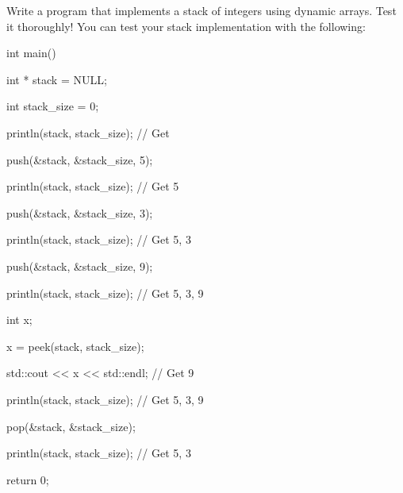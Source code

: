 Write a program that implements a stack of integers using dynamic arrays. Test it thoroughly! You can test your stack implementation with the following:



\begin{consolethree}[escapeinside=||]

int main()

{

    int * stack = NULL;

    int stack_size = 0;

    println(stack, stack_size); // Get {}

    push(&stack, &stack_size, 5);

    println(stack, stack_size); // Get {5}

    push(&stack, &stack_size, 3);

    println(stack, stack_size); // Get {5, 3}

    push(&stack, &stack_size, 9);

    println(stack, stack_size); // Get {5, 3, 9}

    int x;

    x = peek(stack, stack_size);

    std::cout << x << std::endl; // Get 9

    println(stack, stack_size); // Get {5, 3, 9}

    pop(&stack, &stack_size);

    println(stack, stack_size); // Get {5, 3}

    return 0;

}

\end{consolethree}

